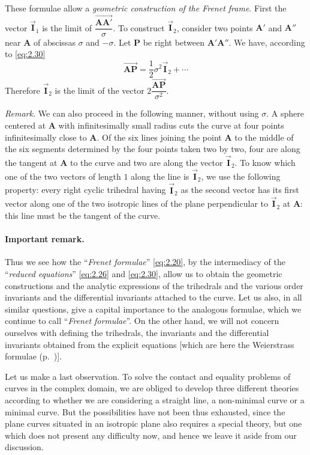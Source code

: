 \documentclass[leqno,11pt]{book}
\numberwithin{equation}{chapter}
\theoremstyle{shape1}
\theoremstyle{shapesmall}
\newcommand{\rvec}[1]{\vec{\mathbf{#1}}}
\newcommand{\ivec}{\rvec{I}}
\newcommand{\somespace}{\vspace{9pt}}
\begin{document}
These formulae allow a \emph{geometric construction of the Frenet frame}. First the vector $\ivec_{1}$ is the limit of $\dfrac{\overrightarrow{\mathbf{AA}'}}{\sigma}$. To construct $\ivec_{2}$, consider two points $\mathbf{A}'$ and $\mathbf{A}''$ near $\mathbf{A}$ of abscissas $\sigma$ and $-\sigma$. Let $\mathbf{P}$ be right between $\mathbf{A}'\mathbf{A}''$. We have, according to \eqref{eq:2.30}
\[
\overrightarrow{\mathbf{AP}}=\frac{1}{2}\sigma^{2}\ivec_{2}+\cdots
\]
Therefore $\ivec_{2}$ is the limit of the vector $2\dfrac{\overrightarrow{\mathbf{AP}}}{\sigma^{2}}$.

\somespace

\emph{Remark.} We can also proceed in the following manner, without using $\sigma$. A sphere centered at $\mathbf{A}$ with infinitesimally small radius cuts the curve at four points infinitesimally close to $\mathbf{A}$.  Of the six lines joining the point $\mathbf{A}$ to the middle of the six segments determined by the four points taken two by two, four are along the tangent at $\mathbf{A}$ to the curve and two are along the vector $\ivec_{2}$. To know which one of the two vectors of length $1$ along the line is $\ivec_{2}$, we use the following property: every right cyclic trihedral having $\ivec_{2}$ as the second vector has its first vector along one of the two isotropic lines of the plane perpendicular to $\ivec_{2}$ at $\mathbf{A}$: this line must be the tangent of the curve.

\paragraph{Important remark.}
\label{sec:42}
Thus we see how the ``\emph{Frenet formulae}'' \eqref{eq:2.20}, by the intermediacy of the ``\emph{reduced equations}'' \eqref{eq:2.26} and \eqref{eq:2.30}, allow us to obtain the geometric constructions and the analytic expressions of the trihedrals and the various order invariants and the differential invariants attached to the curve. Let us also, in all similar questions, give a capital importance to the analogous formulae, which we continue to call ``\emph{Frenet formulae}''. On the other hand, we will not concern ourselves with defining the trihedrals, the invariants and the differential invariants obtained from the explicit equations [which are here the Weierstrass formulae (p.~\pageref{x:weierstrass})].

Let us make a last observation. To solve the contact and equality problems of curves in the complex domain, we are obliged to develop three different theories according to whether we are considering a straight line, a non-minimal curve or a minimal curve. But the possibilities have not been thus exhausted, since the plane curves situated in an isotropic plane also requires a special theory, but one which does not present any difficulty now, and hence we leave it aside from our discussion.
\end{document}
